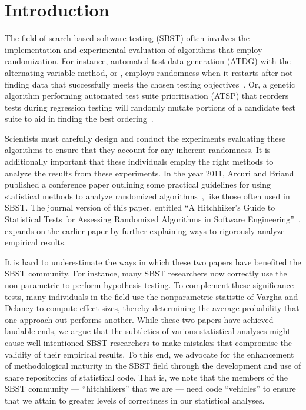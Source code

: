 
\section{Introduction}
\label{sec:introduction}

The field of search-based software testing (SBST) often involves the implementation and experimental evaluation of
algorithms that employ randomization. For instance, automated test data generation (ATDG) with the alternating variable
method, or \AVM, employs randomness when it restarts after not finding data that successfully meets the chosen
testing objectives~\cite{McMinn2015}. Or, a genetic algorithm performing automated test suite prioritisation (ATSP) that
reorders tests during regression testing will randomly mutate portions of a candidate test suite to aid in
finding the best ordering~\cite{Walcott2006}.

Scientists must carefully design and conduct the experiments evaluating these algorithms to ensure that they account for
any inherent randomness. It is additionally important that these individuals employ the right methods to analyze the
results from these experiments. In the year 2011, Arcuri and Briand published a conference paper outlining some
practical guidelines for using statistical methods to analyze randomized algorithms~\cite{Arcuri2011}, like those often
used in SBST. The journal version of this paper, entitled ``A Hitchhiker's Guide to Statistical Tests for Assessing
Randomized Algorithms in Software Engineering''~\cite{Arcuri2014}, expands on the earlier paper by further explaining
ways to rigorously analyze empirical results.

It is hard to underestimate the ways in which these two papers have benefited the SBST community. For instance, many
SBST researchers now correctly use the non-parametric \wilcoxon to perform hypothesis testing. To complement these
significance tests, many individuals in the field use the nonparametric \atwelve statistic of Vargha and Delaney
\cite{Vargha2000} to compute effect sizes, thereby determining the average probability that one approach out performs
another. While these two papers have achieved laudable ends, we argue that the subtleties of various statistical
analyses might cause well-intentioned SBST researchers to make mistakes that compromise the validity of their empirical
results. To this end, we advocate for the enhancement of methodological maturity in the SBST field through the development
and use of share repositories of statistical code. That is, we note that the members of the SBST community ---
``hitchhikers'' that we are --- need code ``vehicles'' to ensure that we attain to greater levels of correctness in our
statistical analyses.


